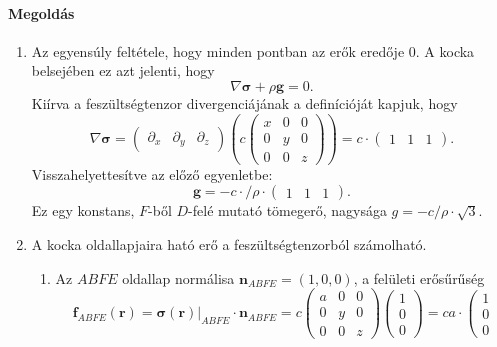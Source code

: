 \documentclass[12pt,a4paper]{scrartcl}
\let\mathbf\bm
\begin{document}
\paragraph{Megoldás}
\begin{enumerate}
\item 
Az egyensúly feltétele, hogy minden pontban az erők eredője 0. A kocka belsejében ez azt jelenti, hogy
\[\nabla {\mathbf{\sigma }} + \rho {\mathbf{g}} = 0.\]
Kiírva a feszültségtenzor divergenciájának a definícióját kapjuk, hogy
\[\nabla {\mathbf{\sigma }} = \left( {\begin{array}{*{20}{c}}
  {{\partial _x}}&{{\partial _y}}&{{\partial _z}} 
\end{array}} \right)\left( {c\left( {\begin{array}{*{20}{c}}
  x&0&0 \\ 
  0&y&0 \\ 
  0&0&z 
\end{array}} \right)} \right) = c \cdot \left( {\begin{array}{*{20}{c}}
  1&1&1 
\end{array}} \right).\]
Visszahelyettesítve az előző egyenletbe:
\[{\mathbf{g}} =  - c \cdot /\rho  \cdot \left( {\begin{array}{*{20}{c}}
  1&1&1 
\end{array}} \right).\] 
Ez egy konstans, $F$-ből $D$-felé mutató tömegerő, nagysága $g =  - c/\rho  \cdot \sqrt 3 $.
\item A kocka oldallapjaira ható erő a feszültségtenzorból számolható.
\begin{enumerate}
\item Az $ABFE$ oldallap normálisa ${{\mathbf{n}}_{ABFE}} = \left( {1,0,0} \right)$, a felületi erősűrűség 
\[{{\mathbf{f}}_{ABFE}}\left( {\mathbf{r}} \right) = {\left. {{\mathbf{\sigma }}\left( {\mathbf{r}} \right)} \right|_{ABFE}} \cdot {{\mathbf{n}}_{ABFE}} = c\left( {\begin{array}{*{20}{c}}
  a&0&0 \\ 
  0&y&0 \\ 
  0&0&z 
\end{array}} \right)\left( {\begin{array}{*{20}{c}}
  1 \\ 
  0 \\ 
  0 
\end{array}} \right) = ca\cdot \left( {\begin{array}{*{20}{c}}
  1 \\ 
  0 \\ 
  0 

\end{array}}\]
\end{enumerate}
\end{enumerate}
\end{document}
